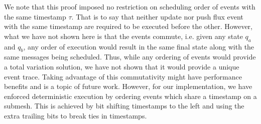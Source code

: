 \begin{remark} We note that this proof imposed no restriction on scheduling order of events with the same timestamp $\tau$. That is to say that neither update nor push flux event with the same timestamp are required to be executed before the other. However, what we have not shown here is that the events commute, i.e. given any state $q_a$ and $q_b$, any order of execution would result in the same final state along with the same messages being scheduled. Thus, while any ordering of events would provide a total variation solution, we have not shown that it would provide a unique event trace. Taking advantage of this commutativity might have performance benefits and is a topic of future work. However, for our implementation, we have enforced deterministic execution by ordering events which share a timestamp on a submesh. This is achieved by bit shifting timestamps to the left and using the extra trailing bits to break ties in timestamps.
\end{remark}